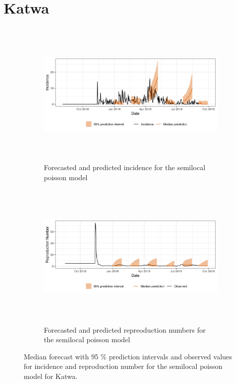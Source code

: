  \section{ Katwa }\begin{figure}[H]\begin{subfigure}{\textwidth}  \centering  \includegraphics[width=0.9\linewidth, height=7cm]{../output/Katwa_predictions.png}  \caption{Forecasted and predicted incidence for the semilocal poisson model}\end{subfigure}

\begin{subfigure}{\textwidth}  \centering  \includegraphics[width=0.9\linewidth, height=7cm]{../output/Katwa_Rs.png}  \caption{Forecasted and predicted repreoduction numbers for the semilocal poisson model}\end{subfigure}  \caption{Median forecast with 95 \% prediction intervals and observed values for incidence and reproduction number for the semilocal poisson model for Katwa.}\end{figure}

